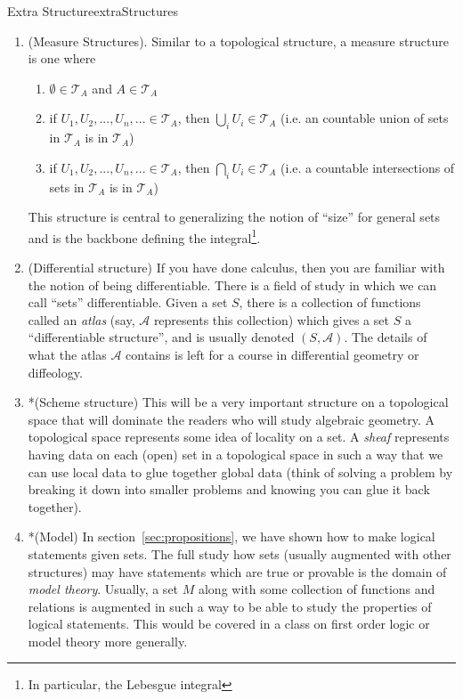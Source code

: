 \documentclass{book}
\newcommand{\CA}{{\mathcal{A}}}
\begin{document}
\begin{example}{Extra Structure}{extraStructures}
\begin{enumerate}
\begin{enumerate}
					intersections of sets in $\mathcal{T}_A$ is in $\mathcal{T}_A$)
			\end{enumerate}
			Then $(A, \mathcal{T}_A)$ is called a \emph{topology}. If a set is augmented with a sets of sets that follow
			these rules, it's called a \emph{topological structure}. Topology is the natural space in which much of
			Real and Complex Analysis, as well as [non-classical] geometry takes place. It is the ``coarsest''
			structure we add to sets to give sets some notion of locality.
		\item (Measure Structures). Similar to a topological structure, a measure structure is one where
			\begin{enumerate}
				\item $\emptyset \in \mathcal{T}_A$ and $A \in \mathcal{T}_A$
				\item if $U_1, U_2, ..., U_n, ... \in \mathcal{T}_A$, then $\bigcup_i U_i \in \mathcal{T}_A$ (i.e. an
					countable union of sets in $\mathcal{T}_A$ is in $\mathcal{T}_A$)
				\item if $U_1, U_2, ..., U_n, ... \in \mathcal{T}_A$, then $\bigcap_i U_i \in \mathcal{T}_A$ (i.e.
					a countable
					intersections of sets in $\mathcal{T}_A$ is in $\mathcal{T}_A$)
			\end{enumerate}
			This structure is central to generalizing the notion of ``size'' for general sets and is the backbone
			defining the integral\footnote{In particular, the Lebesgue integral}.
		\item (Differential structure) If you have done calculus, then you are familiar with the notion of being
			differentiable. There is a field of study in which we can call ``sets'' differentiable. Given a set $S$,
			there is a collection of functions called an \emph{atlas} (say, $\CA$ represents this collection) which
			gives a set $S$ a ``differentiable structure'', and is usually denoted $(S, \CA)$. The details of what the atlas
			$\CA$ contains is left for a course in differential geometry or diffeology.
		\item *(Scheme structure) This will be a very important structure on a topological space that will
			dominate the readers who will study algebraic geometry. A topological space represents some idea
			of locality on a set. A \emph{sheaf} represents having data on each (open) set in a topological
			space in such a way that we can use local data to glue together global data (think of solving
			a problem by breaking it down into smaller problems and knowing you can glue it back together).
		\item *(Model) In section~\ref{sec:propositions}, we have shown how to make logical statements given sets. The
			full study how sets (usually augmented with other structures) may have statements which are true or provable
			is the domain of \emph{model theory}. Usually, a set $M$ along with some collection of functions and
			relations is augmented in such a way to be able to study the properties of logical statements. This would be
			covered in a class on first order logic or model theory more generally.
	\end{enumerate}
\end{example}
\end{document}
